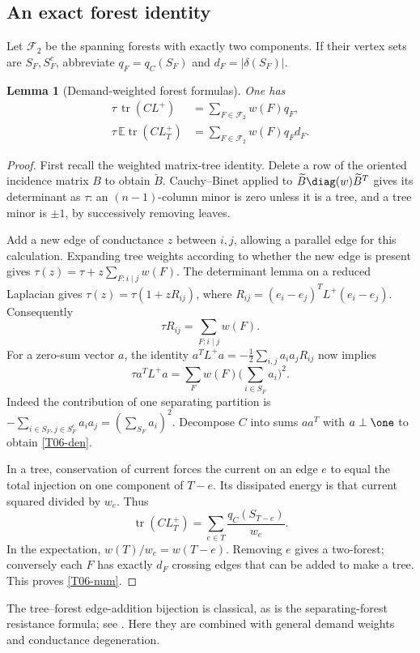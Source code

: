 \documentclass[11pt,a4paper]{article}
\newtheorem{lemma}[theorem]{Lemma}
\theoremstyle{definition}\newtheorem{definition}[theorem]{Definition}
\theoremstyle{remark}\newtheorem{remark}[theorem]{Remark}
\DeclareMathOperator{\tr}{tr}\DeclareMathOperator{\supp}{supp}\DeclareMathOperator{\TV}{TV}
\numberwithin{equation}{section}
\begin{document}
\subsection{An exact forest identity}\label{T06-sec-2}
Let $\mathcal F_2$ be the spanning forests with exactly two components. If their vertex sets are $S_F,S_F^c$, abbreviate $q_F=q_C(S_F)$ and $d_F=|\delta(S_F)|$.
\begin{lemma}[Demand-weighted forest formulas]\label{T06-forest}
One has
\begin{align}
 \tau\,\tr(CL^+)&=\sum_{F\in\mathcal F_2}w(F)q_F,\label{T06-den}\\
 \tau\,\mathbb E\tr(CL_T^+)&=\sum_{F\in\mathcal F_2}w(F)q_Fd_F.\label{T06-num}
\end{align}
\end{lemma}
\begin{proof}
First recall the weighted matrix-tree identity. Delete a row of the oriented incidence matrix $B$ to obtain $\widetilde B$. Cauchy--Binet applied to $\widetilde B\diag(w)\widetilde B^T$ gives its determinant as $\tau$: an $(n-1)$-column minor is zero unless it is a tree, and a tree minor is $\pm1$, by successively removing leaves.

Add a new edge of conductance $z$ between $i,j$, allowing a parallel edge for this calculation. Expanding tree weights according to whether the new edge is present gives $\tau(z)=\tau+z\sum_{F:i\mid j}w(F)$. The determinant lemma on a reduced Laplacian gives $\tau(z)=\tau(1+zR_{ij})$, where $R_{ij}=(e_i-e_j)^TL^+(e_i-e_j)$. Consequently
\[
 \tau R_{ij}=\sum_{F:i\mid j}w(F).
\]
For a zero-sum vector $a$, the identity $a^TL^+a=-\frac12\sum_{i,j}a_i a_jR_{ij}$ now implies
\[
 \tau a^TL^+a=\sum_F w(F)\Big(\sum_{i\in S_F}a_i\Big)^2.
\]
Indeed the contribution of one separating partition is
$-\sum_{i\in S_F,j\in S_F^c}a_i a_j=(\sum_{S_F}a_i)^2$.
Decompose $C$ into sums $aa^T$ with $a\perp\one$ to obtain \eqref{T06-den}.

In a tree, conservation of current forces the current on an edge $e$ to equal the total injection on one component of $T-e$. Its dissipated energy is that current squared divided by $w_e$. Thus
\[
 \tr(CL_T^+)=\sum_{e\in T}\frac{q_C(S_{T-e})}{w_e}.
\]
In the expectation, $w(T)/w_e=w(T-e)$. Removing $e$ gives a two-forest; conversely each $F$ has exactly $d_F$ crossing edges that can be added to make a tree. This proves \eqref{T06-num}.
\end{proof}
The tree--forest edge-addition bijection is classical, as is the separating-forest resistance formula; see \cite{ref045,ref046}. Here they are combined with general demand weights and conductance degeneration.
\end{document}
